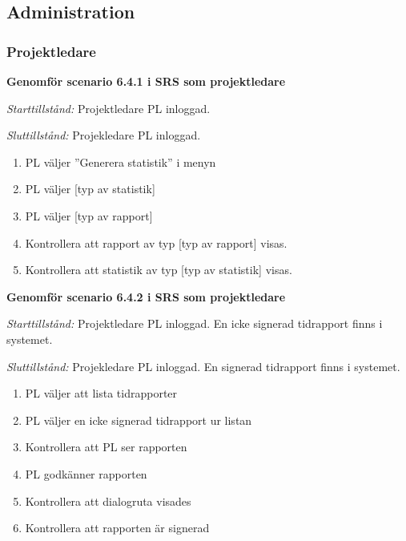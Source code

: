 \documentclass[a4paper]{article}
\begin{document}
\subsection{Administration}

\subsubsection{Projektledare}
\begin{ST}

\item
\textbf{Genomför scenario 6.4.1 i SRS som projektledare}

\emph{Starttillstånd:} Projektledare PL inloggad.

\emph{Sluttillstånd:} Projekledare PL inloggad.

\begin{enumerate}
\item
PL väljer ''Generera statistik'' i menyn
\item
PL väljer [typ av statistik]
\item 
PL väljer [typ av rapport]
\item
Kontrollera att rapport av typ [typ av rapport] visas.
\item
Kontrollera att statistik av typ [typ av statistik] visas.
\end{enumerate}

\item
\textbf{Genomför scenario 6.4.2 i SRS som projektledare}

\emph{Starttillstånd:} Projektledare PL inloggad. En icke signerad tidrapport finns i systemet.

\emph{Sluttillstånd:} Projekledare PL inloggad. En signerad tidrapport finns i systemet.

\begin{enumerate}

\item
PL väljer att lista tidrapporter
\item
PL väljer en icke signerad tidrapport ur listan
\item
Kontrollera att PL ser rapporten
\item
PL godkänner rapporten
\item
Kontrollera att dialogruta visades
\item
Kontrollera att rapporten är signerad

\end{enumerate}


\end{ST}
\end{document}
